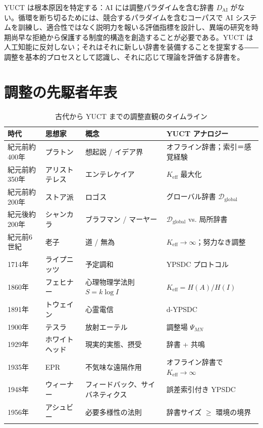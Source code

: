 \documentclass[12pt,a4paper]{article}
\begin{document}
	YUCT は根本原因を特定する：AI には調整パラダイムを含む辞書 \(D_{\text{AI}}\) がない。循環を断ち切るためには、競合するパラダイムを含むコーパスで AI システムを訓練し、適合性ではなく説明力を報いる評価指標を設計し、異端の研究を時期尚早な拒絶から保護する制度的構造を創造することが必要である。YUCT は人工知能に反対しない；それはそれに新しい辞書を装備することを提案する――調整を基本的プロセスとして認識し、それに応じて理論を評価する辞書を。
	
	\section{調整の先駆者年表}
	
	\begin{table}[htbp]
		\centering
		\caption{古代から YUCT までの調整直観のタイムライン}
		\label{tab:timeline}
		\small
		\begin{tabular}{p{1.2cm}p{3cm}p{4.5cm}p{4cm}}
			\toprule
			\textbf{時代} & \textbf{思想家} & \textbf{概念} & \textbf{YUCT アナロジー} \\
			\midrule
			紀元前約400年 & プラトン & 想起説 / イデア界 & オフライン辞書；索引＝感覚経験 \\
			紀元前約350年 & アリストテレス & エンテレケイア & \(K_{\mathrm{eff}}\) 最大化 \\
			紀元前約200年 & ストア派 & ロゴス & グローバル辞書 \(\mathcal{D}_{\text{global}}\) \\
			紀元後約200年 & シャンカラ & ブラフマン / マーヤー & \(\mathcal{D}_{\text{global}}\) vs. 局所辞書 \\
			紀元前6世紀 & 老子 & 道 / 無為 & \(K_{\mathrm{eff}} \to \infty\)；努力なき調整 \\
			1714年 & ライプニッツ & 予定調和 & YPSDC プロトコル \\
			1860年 & フェヒナー & 心理物理学法則 \(S = k \log I\) & \(K_{\mathrm{eff}} = H(A)/H(I)\) \\
			1891年 & トウェイン & 心霊電信 & d-YPSDC \\
			1900年 & テスラ & 放射エーテル & 調整場 \(\Psi_{MN}\) \\
			1929年 & ホワイトヘッド & 現実的実態、摂受 & 辞書 + 共鳴 \\
			1935年 & EPR & 不気味な遠隔作用 & オフライン辞書で \(K_{\mathrm{eff}} \to \infty\) \\
			1948年 & ウィーナー & フィードバック、サイバネティクス & 誤差索引付き YPSDC \\
			1956年 & アシュビー & 必要多様性の法則 & 辞書サイズ \(\ge\) 環境の境界 \\

\end{tabular}
\end{table}
\end{document}
